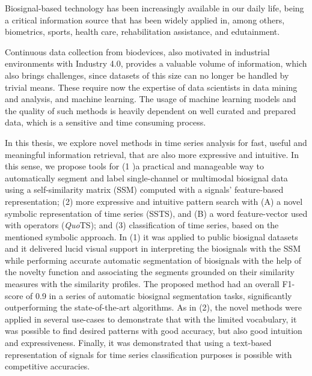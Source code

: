 
%

Biosignal-based technology has been increasingly available in our daily life, being a critical information source that has been widely applied in, among others, biometrics, sports, health care, rehabilitation assistance, and edutainment.

Continuous data collection from biodevices, also motivated in industrial environments with Industry 4.0, provides a valuable volume of information, which also brings challenges, since datasets of this 
size can no longer be handled by trivial means. These require now the expertise of data scientists in data mining and analysis, and machine learning. The usage of machine learning models and the quality of such methods is heavily dependent on well curated and prepared data, which is a sensitive and time consuming process. 

In this thesis, we explore novel methods in time series analysis for fast, useful and meaningful information retrieval, that are also more expressive and intuitive. In this sense, we propose tools for (1 )a practical and manageable way to automatically segment and label single-channel or multimodal biosignal data using a self-similarity matrix (SSM) computed with a signals' feature-based representation; (2) more expressive and intuitive pattern search with (A) a novel symbolic representation of time series (SSTS), and (B) a word feature-vector used with operators (\textit{Quo}TS); and (3) classification of time series, based on the mentioned symbolic approach. In (1) it was applied to public biosignal datasets and it delivered lucid visual support in interpreting the biosignals with the SSM while performing accurate automatic segmentation of biosignals with the help of the novelty function and associating the segments grounded on their similarity measures with the similarity profiles. The proposed method had an overall F1-score of 0.9 in a series of automatic biosignal segmentation tasks, significantly outperforming the state-of-the-art algorithms. As in (2), the novel methods were applied in several use-cases to demonstrate that with the limited vocabulary, it was possible to find desired patterns with good accuracy, but also good intuition and expressiveness. Finally, it was demonstrated that using a text-based representation of signals for time series classification purposes is possible with competitive accuracies.

